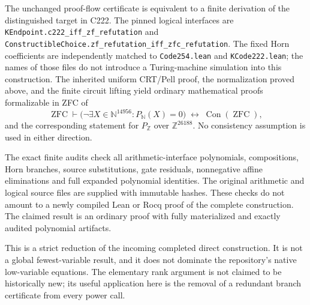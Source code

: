 The unchanged proof-flow certificate is equivalent to a finite derivation of
the distinguished target in C222. The pinned logical interfaces are
\texttt{KEndpoint.c222\_iff\_zf\_refutation} and
\texttt{ConstructibleChoice.zf\_refutation\_iff\_zfc\_refutation}.
The fixed Horn coefficients are independently matched to
\texttt{Code254.lean} and \texttt{KCode222.lean}; the names of those files
do not introduce a Turing-machine simulation into this construction.
The inherited uniform CRT/Pell proof, the normalization proved above, and
the finite circuit lifting yield ordinary mathematical proofs formalizable
in ZFC of
\[
 \operatorname{ZFC}\vdash
 \bigl(\neg\exists X\in\mathbb N^{14956}:P_{\mathbb N}(X)=0\bigr)
 \;\longleftrightarrow\;\operatorname{Con}(\operatorname{ZFC}),
\]
and the corresponding statement for $P_{\mathbb Z}$ over
$\mathbb Z^{26188}$. No consistency assumption is used in either direction.

The exact finite audits check all arithmetic-interface polynomials,
compositions, Horn branches, source substitutions, gate residuals,
nonnegative affine eliminations and full expanded polynomial identities.
The original arithmetic and logical source files are supplied with immutable
hashes. These checks do not amount to a newly compiled Lean or Rocq proof of
the complete construction. The claimed result is an ordinary proof with
fully materialized and exactly audited polynomial artifacts.

This is a strict reduction of the incoming completed direct construction.
It is not a global fewest-variable result, and it does not dominate the
repository's native low-variable equations. The elementary rank argument is
not claimed to be historically new; its useful application here is the
removal of a redundant branch certificate from every power call.

